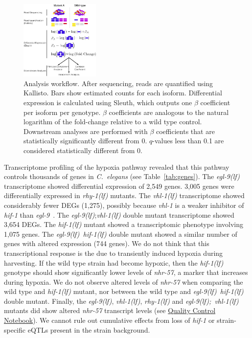 \documentclass[9pt,twocolumn,twoside]{pnas-new}
\newcommand{\cel}{\emph{C.~elegans}}
\newcommand{\gene}[1]{\mbox{\emph{#1}}}
\newcommand{\egl}{\gene{egl-9(lf)}}
\newcommand{\rhy}{\gene{rhy-1(lf)}}
\newcommand{\vhl}{\gene{vhl-1(lf)}}
\newcommand{\eglvhl}{\gene{egl-9(lf); vhl-1(lf)}}
\newcommand{\eglhif}{\gene{egl-9(lf) hif-1(lf)}}
\newcommand{\hif}{\gene{hif-1(lf)}}
\newcommand{\egln}{2,549}
\newcommand{\rhyn}{3,005}
\newcommand{\vhln}{1,275}
\newcommand{\eglvhln}{3,654}
\newcommand{\hifn}{1,075}
\newcommand{\eglhifn}{744}
\begin{document}
\begin{figure}[tbhp]
  \centering
  \includegraphics[width=0.35\textwidth]{../figs/meaningofbeta.pdf}
  \caption{
    Analysis workflow. After sequencing, reads are quantified using Kallisto.
    Bars show estimated counts for each isoform. Differential expression is
    calculated using Sleuth, which outputs one $\beta$ coefficient per isoform
    per genotype. $\beta$ coefficients are analogous to the natural logarithm of
    the fold-change relative to a wild type control. Downstream analyses are
    performed with $\beta$ coefficients that are statistically significantly
    different from 0. $q$-values less than 0.1 are considered statistically
    different from 0.
  }
\label{fig:explain}
\end{figure}

Transcriptome profiling of the hypoxia pathway revealed that this pathway
controls thousands of genes in \cel{} (see Table~\ref{tab:genes}). The \egl{}
transcriptome showed differential expression of \egln{} genes. \rhyn{} genes
were differentially expressed in \rhy{} mutants. The \vhl{} transcriptome showed
considerably fewer DEGs (\vhln{}), possibly because \gene{vhl-1} is a weaker
inhibitor of \gene{hif-1} than \gene{egl-9}~\cite{Shao2009}. The \egl{};\vhl{}
double mutant transcriptome showed \eglvhln{} DEGs. The \hif{} mutant showed a
transcriptomic phenotype involving \hifn{} genes. The \eglhif{} double mutant
showed a similar number of genes with altered expression (\eglhifn{} genes).
\color{purple}
We do not think that this transcriptional response is the due to transiently
induced hypoxia during harvesting. If the wild type strain had become hypoxic,
then the \hif{} genotype should show significantly lower levels of
\gene{nhr-57}, a marker that increases during hypoxia. We do not observe altered
levels of \gene{nhr-57} when comparing the wild type and \hif{} mutant, nor
between the wild type and \eglhif{} double mutant. Finally, the \egl{}, \vhl{},
\rhy{} and \eglvhl{} mutants did show altered \gene{nhr-57} transcript levels
(see
\href{https://wormlabcaltech.github.io/mprsq/analysis_notebooks/5_quality_check.html}{
Quality Control Notebook}). We cannot rule out cumulative effects from loss of
\gene{hif-1} or strain-specific eQTLs present in the strain background.
\color{black}
\end{document}
